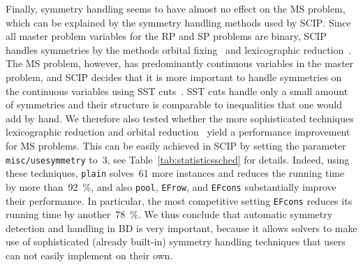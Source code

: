 \documentclass[a4paper,10pt]{article}
\newcommand{\solver}[1]{\textsc{#1}}
\newcommand{\scip}{\solver{SCIP}\xspace}
\newcommand{\setting}[1]{\texttt{#1}}
\newcommand{\rectanglepack}{RP\xspace}
\newcommand{\spherepack}{SP\xspace}
\newcommand{\scheduling}{MS\xspace}
\theoremstyle{definition}
\begin{document}
Finally, symmetry handling seems to have almost no effect on the \scheduling problem, which can be explained by the symmetry handling methods used by \scip.
Since all master problem variables for the \rectanglepack and \spherepack problems are binary, \scip handles symmetries by the methods orbital fixing~\cite{OstrowskiEtAl2011,PfetschRehn2019} and lexicographic reduction~\cite{DoornmalenHojny2024a}.
The \scheduling problem, however, has predominantly continuous variables in the master problem, and \scip decides that it is more important to handle symmetries on the continuous variables using SST cuts~\cite{LibertiOstrowski2014,Salvagnin2018}.
SST cuts handle only a small amount of symmetries and their structure is comparable to inequalities that one would add by hand.
We therefore also tested whether the more sophisticated techniques lexicographic reduction and orbital reduction~\cite{DoornmalenHojny2024a} yield a performance improvement for \scheduling problems.
This can be easily achieved in \scip by setting the parameter \setting{misc/usesymmetry} to~$3$, see Table~\ref{tab:statisticssched} for details.
Indeed, using these techniques, \setting{plain} solves~61 more instances and reduces the running time by more than~\SI{92}{\percent}, and also \setting{pool}, \setting{EFrow}, and \setting{EFcons} substantially improve their performance.
In particular, the most competitive setting \setting{EFcons} reduces its running time by another~\SI{78}{\percent}.
We thus conclude that automatic symmetry detection and handling in BD is very important, because it allows solvers to make use of sophisticated (already built-in) symmetry handling techniques that users can not easily implement on their own.
\end{document}
